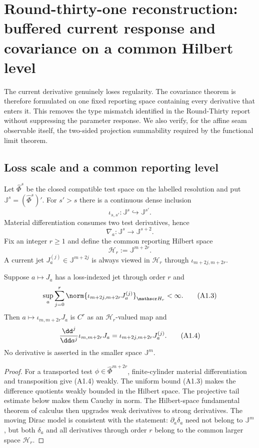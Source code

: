 \section{Round-thirty-one reconstruction: buffered current response and covariance on a common Hilbert level}
\label{sec:r31-a1}

The current derivative genuinely loses regularity.  The covariance theorem is
therefore formulated on one fixed reporting space containing every derivative
that enters it.  This removes the type mismatch identified in the
Round-Thirty report without suppressing the parameter response.  We also
verify, for the affine seam observable itself, the two-sided projection
summability required by the functional limit theorem.

\subsection{Loss scale and a common reporting level}

Let $\widehat\Phi^s$ be the closed compatible test space on the labelled
resolution and put $\mathbb J^s=(\widehat\Phi^s)'$.  For $s'>s$ there is a
continuous dense inclusion
\[
 \iota_{s,s'}:\mathbb J^s\hookrightarrow\mathbb J^{s'}.
\]
Material differentiation consumes two test derivatives, hence
\[
 \nabla_a:\mathbb J^s\longrightarrow\mathbb J^{s+2}.      \tag{A1.1}
\]
Fix an integer $r\ge1$ and define the common reporting Hilbert space
\[
 \mathscr H_r:=\mathbb J^{m+2r}.                           \tag{A1.2}
\]
A current jet $J_a^{(j)}\in\mathbb J^{m+2j}$ is always viewed in
$\mathscr H_r$ through $\iota_{m+2j,m+2r}$.

\begin{lemma}
\label{lem:r31-a1-buffer}
Suppose $a\mapsto J_a$ has a loss-indexed jet through order $r$ and
\[
 \sup_a\sum_{j=0}^r
 \norm{\iota_{m+2j,m+2r}J_a^{(j)}}_{\mathscr H_r}<\infty. \tag{A1.3}
\]
Then $a\mapsto \iota_{m,m+2r}J_a$ is $C^r$ as an
$\mathscr H_r$-valued map and
\[
 {\dd^j\over\dd a^j}\iota_{m,m+2r}J_a
 =\iota_{m+2j,m+2r}J_a^{(j)}.                              \tag{A1.4}
\]
No derivative is asserted in the smaller space $\mathbb J^m$.
\end{lemma}

\begin{proof}
For a transported test $\phi\in\widehat\Phi^{m+2r}$, finite-cylinder
material differentiation and transposition give (A1.4) weakly.  The uniform
bound (A1.3) makes the difference quotients weakly bounded in the Hilbert
space.  The projective tail estimate below makes them Cauchy in norm.  The
Hilbert-space fundamental theorem of calculus then upgrades weak derivatives
to strong derivatives.  The moving Dirac model is consistent with the
statement: $\partial_a\delta_a$ need not belong to $\mathbb J^m$, but both
$\delta_a$ and all derivatives through order $r$ belong to the common larger
space $\mathscr H_r$.
\end{proof}

